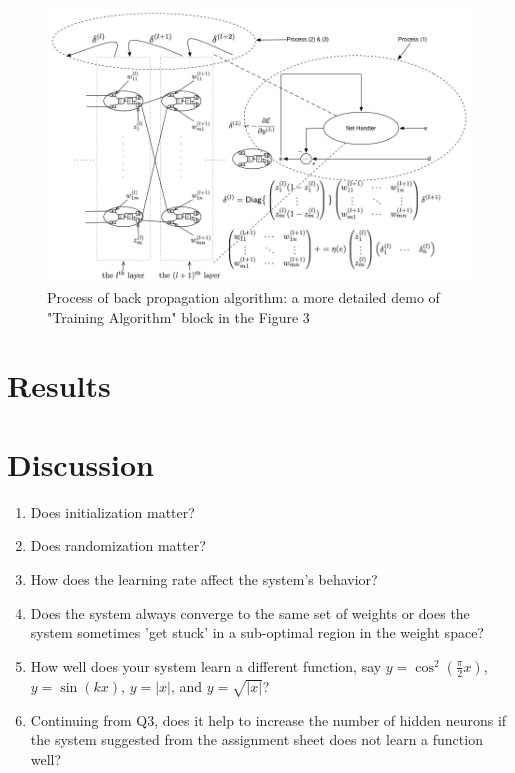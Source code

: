\documentclass[12pt]{article}
\begin{document}
\begin{figure}[ht]
	\vspace*{-1em}
	\centering
	\includegraphics[scale=.52]{../res/BPAlgoDiagram.png}
	\caption{Process of back propagation algorithm: a more detailed demo of "Training Algorithm" block in the Figure 3}
\end{figure}

\section*{Results}
\vspace{-20pt}
\noindent\makebox[\linewidth]{\rule{\textwidth}{0.4pt}}

\section*{Discussion}
\vspace{-20pt}
\noindent\makebox[\linewidth]{\rule{\textwidth}{0.4pt}}

\begin{enumerate}
	\item Does initialization matter?
	\item Does randomization matter?
	\item How does the learning rate affect the system's behavior?
	\item Does the system always converge to the same set of weights or does the system sometimes 'get stuck' in a sub-optimal region 
		in the weight space?
	\item How well does your system learn a different function, say $y=\cos^2(\frac{\pi}{2}x)$, $y=\sin(kx)$, $y=|x|$, and $y=\sqrt{|x|}$?
	\item Continuing from Q3, does it help to increase the number of hidden neurons if the system suggested from the assignment sheet 
		does not learn a function well?
\end{enumerate}
\end{document}
